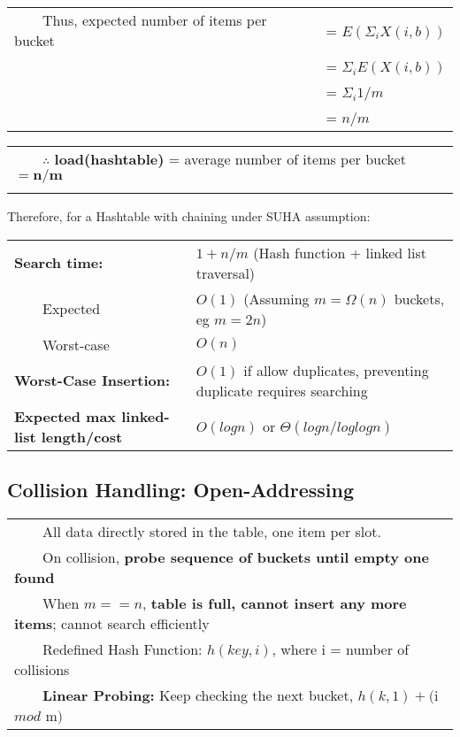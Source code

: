 \documentclass{article}
\newcommand{\tabitem}{~~\llap{\textbullet}~~}
\begin{document}
    \begin{tabular}{ll}
        \tabitem Thus, expected number of items per bucket &= $E(\Sigma_{i}X(i, b))$\\
        &= $\Sigma_{i}E(X(i, b))$\\
        &= $\Sigma_{i}1/m$\\
        &= $n/m$\\
    \end{tabular}

    \begin{tabular}{l}
        \tabitem $\therefore$ \textbf{load(hashtable)} = average number of items per bucket $\bm{= n/m}$\\\\
    \end{tabular}

    Therefore, for a Hashtable with chaining under SUHA assumption:\\

    \begin{tabular}{ll}
        \toprule
        \textbf{Search time:} & $1+ n/m$ (Hash function + linked list traversal)\\
        \tabitem Expected & $O(1)$  (Assuming $m = \Omega(n)$ buckets, eg $m = 2n$)\\
        \tabitem Worst-case & $O(n)$\\
        \midrule
        \textbf{Worst-Case Insertion:} & $O(1)$ if allow duplicates, preventing duplicate requires searching\\
        \midrule
        \textbf{Expected max linked-list length/cost} & $O(logn)$ or $\Theta(logn/loglogn)$\\
        \bottomrule
    \end{tabular}

    \pagebreak

    \subsection{Collision Handling: Open-Addressing}

    
    \begin{tabular}{l}
        \tabitem All data directly stored in the table, one item per slot.\\
        \tabitem On collision, \textbf{probe sequence of buckets until empty one found}\\
        \tabitem When $m == n$, \textbf{table is full, cannot insert any more items}; cannot search efficiently\\
        \tabitem Redefined Hash Function: $h(key, i)$, where i = number of collisions\\
        \tabitem \textbf{Linear Probing:} Keep checking the next bucket, $h(k, 1) + ($i $mod$ m$)$\\
    \end{tabular}
\end{document}
